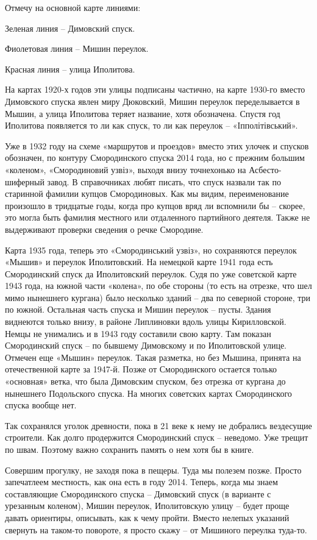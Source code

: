 Отмечу на основной карте линиями:

Зеленая линия – Димовский спуск.

Фиолетовая линия – Мишин переулок.

Красная линия – улица Иполитова.

На картах 1920-х годов эти улицы подписаны частично, на карте 1930-го вместо Димовского спуска явлен миру Дюковский, Мишин переулок переделывается в Мышин, а улица Иполитова теряет название, хотя обозначена. Спустя год Иполитова появляется то ли как спуск, то ли как переулок – «Іпполітівський». 

Уже в 1932 году на схеме «маршрутов и проездов» вместо этих улочек и спусков обозначен, по контуру Смородинского спуска 2014 года, но с прежним большим «коленом», «Смородиновий узвіз», выходя внизу точнехонько на Асбесто-шиферный завод. В справочниках любят писать, что спуск назвали так по старинной фамилии купцов Смородиновых. Как мы видим, переименование произошло в тридцатые годы, когда про купцов вряд ли вспомнили бы – скорее, это могла быть фамилия местного или отдаленного партийного деятеля. Также не выдерживают проверки сведения о речке Смородине.

Карта 1935 года, теперь это «Смородинський узвіз», но сохраняются переулок «Мышив» и переулок Иполитовский. На немецкой карте 1941 года есть Смородинский спуск да Иполитовский переулок. Судя по уже советской карте 1943 года, на южной части «колена», по обе стороны (то есть на отрезке, что шел мимо нынешнего кургана) было несколько зданий – два по северной стороне, три по южной. Остальная часть спуска и Мишин переулок – пусты. Здания виднеются только внизу, в районе Липлиновки вдоль улицы Кирилловской. Немцы не унимались и в 1943 году составили свою карту. Там показан Смородинский спуск – по бывшему Димовскому и по Иполитовской улице. Отмечен еще «Мышин» переулок. Такая разметка, но без Мышина, принята на отечественной карте за 1947-й. Позже от Смородинского остается только «основная» ветка, что была Димовским спуском, без отрезка от кургана до нынешнего Подольского спуска. На многих советских картах Смородинского спуска вообще нет.

Так сохранялся уголок древности, пока в 21 веке к нему не добрались вездесущие строители. Как долго продержится Смородинский спуск – неведомо. Уже трещит по швам. Поэтому важно сохранить память о нем хотя бы в книге.

Совершим прогулку, не заходя пока в пещеры. Туда мы полезем позже. Просто запечатлеем местность, как она есть в году 2014. Теперь, когда мы знаем составляющие Смородинского спуска – Димовский спуск (в варианте с урезанным коленом), Мишин переулок, Иполитовскую улицу – будет проще давать ориентиры, описывать, как к чему пройти. Вместо нелепых указаний свернуть на таком-то повороте, я просто скажу – от Мишиного переулка туда-то. 

